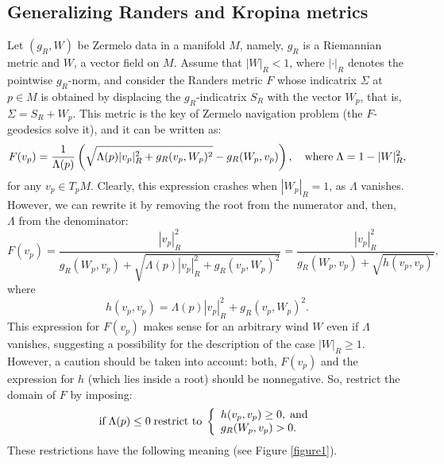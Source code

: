 \documentclass[reqno,10pt]{amsart}
\begin{document}
\subsection{Generalizing Randers and Kropina metrics}
Let $(g_R,W)$ be Zermelo data  in a manifold $M$, namely, $g_R$ is a Riemannian metric and $W$, a vector field on $M$. Assume that  $|W|_R<1$, where $|\cdot |_R$ denotes the pointwise $g_R$-norm, and consider the Randers metric $F$ whose indicatrix $\Sigma$ at $p\in M$   is 
obtained by displacing the $g_R$-indicatrix $S_R$  with the vector  $W_p$, that is, $\Sigma = S_R+ W_p$. This metric is the  key of Zermelo navigation problem (the $F$-geodesics solve it), and it can be written as:
$$
F(v_p)= \frac{1}{\Lambda(p)} \left(\sqrt{\Lambda(p) |v_p|_R^2+ g_R(v_p,W_p)^2}-g_R(W_p,v_p)\right) , \quad \hbox{where} \; \Lambda= 1-|W|_R^2,
$$ 
 for any $v_p\in T_pM$. 
Clearly, this expression crashes when $|W_p|_R=1$, as $\Lambda$ vanishes. However, we can  rewrite it by removing the root  from  the numerator and, then, 
$\Lambda$  from  the denominator:
\begin{equation}\label{conicF}
F(v_p)= \frac{|v_p|_R^2}
{g_R(W_p,v_p)+\sqrt{\Lambda(p) |v_p|_R^2+ g_R(v_p,W_p)^2}} = \frac{|v_p|_R^2}
{g_R(W_p,v_p)+\sqrt{h(v_p,v_p)}},
\end{equation}
where 
\begin{equation}\label{hmetric}h(v_p,v_p)= \Lambda(p) |v_p|_R^2+ g_R(v_p,W_p)^2.\end{equation}
This expression for $F(v_p)$ makes sense for an arbitrary wind $W$ even if $\Lambda$ vanishes, suggesting a possibility for the description of the case $|W|_R\geq  1$. However, a  caution should be taken into account: both, $F(v_p)$ and the expression for $h$ (which lies inside a root) should be nonnegative. So, restrict the domain of $F$ by imposing:
\begin{equation}\label{Arestriction}
\hbox{if} \; \Lambda(p)\leq 0 \; \hbox{restrict to} \; 
\left\{\begin{array}{ll}h(v_p,v_p)\geq 0, \; \hbox{and} \\ g_R(W_p,v_p)>0.
\end{array}\right.
\end{equation}
These restrictions have the following meaning (see Figure \ref{figure1}). 
\end{document}
